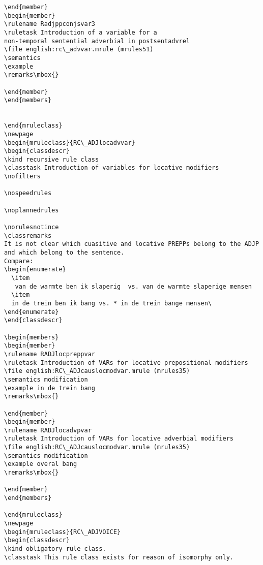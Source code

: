 \begin{verbatim}
\end{member}
\begin{member}
\rulename Radjppconjsvar3
\ruletask Introduction of a variable for a 
non-temporal sentential adverbial in postsentadvrel
\file english:rc\_advvar.mrule (mrules51)
\semantics
\example
\remarks\mbox{}

\end{member}
\end{members}


\end{mruleclass}
\newpage
\begin{mruleclass}{RC\_ADJlocadvvar}
\begin{classdescr}
\kind recursive rule class
\classtask Introduction of variables for locative modifiers
\nofilters

\nospeedrules

\noplannedrules

\norulesnotince
\classremarks 
It is not clear which cuasitive and locative PREPPs belong to the ADJP
and which belong to the sentence. 
Compare: 
\begin{enumerate}
  \item 
   van de warmte ben ik slaperig  vs. van de warmte slaperige mensen 
  \item
  in de trein ben ik bang vs. * in de trein bange mensen\
\end{enumerate}
\end{classdescr}

\begin{members}
\begin{member}
\rulename RADJlocpreppvar 
\ruletask Introduction of VARs for locative prepositional modifiers 
\file english:RC\_ADJcauslocmodvar.mrule (mrules35)
\semantics modification
\example in de trein bang 
\remarks\mbox{}

\end{member}
\begin{member}
\rulename RADJlocadvpvar
\ruletask Introduction of VARs for locative adverbial modifiers 
\file english:RC\_ADJcauslocmodvar.mrule (mrules35)
\semantics modification
\example overal bang 
\remarks\mbox{}

\end{member}
\end{members}

\end{mruleclass}
\newpage
\begin{mruleclass}{RC\_ADJVOICE}
\begin{classdescr}
\kind obligatory rule class.
\classtask This rule class exists for reason of isomorphy only.


\end{verbatim}
